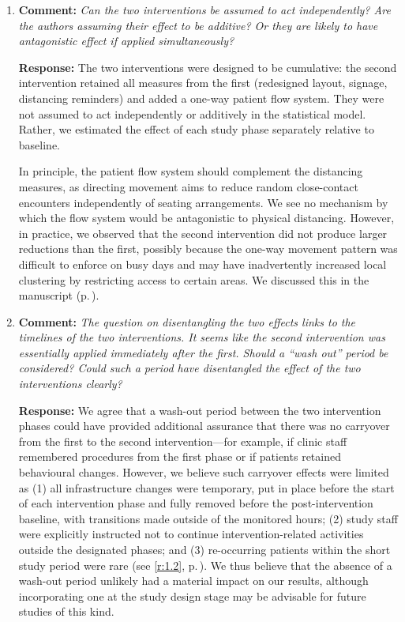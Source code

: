 \documentclass[11pt]{article}
\newcommand{\comment}[1]{\textbf{Comment:} \textit{#1}}
\newcommand{\response}[1]{\textbf{Response:} #1}
\begin{document}
\begin{enumerate}[label=\textbf{R3.\arabic*.}, leftmargin=*]

\item\label{r:3.1} \comment{Can the two interventions be assumed to act independently? Are the authors assuming their effect to be additive? Or they are likely to have antagonistic effect if applied simultaneously?}

\response{The two interventions were designed to be cumulative: the second intervention retained all measures from the first (redesigned layout, signage, distancing reminders) and added a one-way patient flow system. They were not assumed to act independently or additively in the statistical model. Rather, we estimated the effect of each study phase separately relative to baseline.

In principle, the patient flow system should complement the distancing measures, as directing movement aims to reduce random close-contact encounters independently of seating arrangements. We see no mechanism by which the flow system would be antagonistic to physical distancing. However, in practice, we observed that the second intervention did not produce larger reductions than the first, possibly because the one-way movement pattern was difficult to enforce on busy days and may have inadvertently increased local clustering by restricting access to certain areas. We discussed this in the manuscript (p.\,\pageref{disc:interventions}).}

\item\label{r:3.2} \comment{The question on disentangling the two effects links to the timelines of the two interventions. It seems like the second intervention was essentially applied immediately after the first. Should a ``wash out'' period be considered? Could such a period have disentangled the effect of the two interventions clearly?}

\response{We agree that a wash-out period between the two intervention phases could have provided additional assurance that there was no carryover from the first to the second intervention---for example, if clinic staff remembered procedures from the first phase or if patients retained behavioural changes. However, we believe such carryover effects were limited as (1) all infrastructure changes were temporary, put in place before the start of each intervention phase and fully removed before the post-intervention baseline, with transitions made outside of the monitored hours; (2) study staff were explicitly instructed not to continue intervention-related activities outside the designated phases; and (3) re-occurring patients within the short study period were rare (see \ref{r:1.2}, p.\,\pageref{chg:R1.2}). We thus believe that the absence of a wash-out period unlikely had a material impact on our results, although incorporating one at the study design stage may be advisable for future studies of this kind.}


\end{enumerate}
\end{document}
